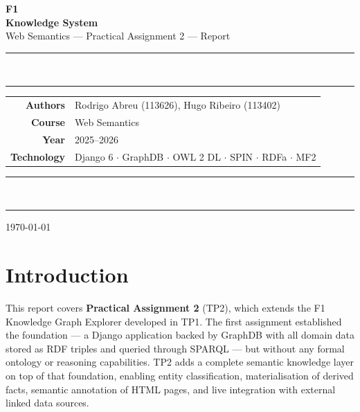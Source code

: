 \documentclass[12pt,a4paper]{article}
\begin{document}
\begin{titlepage}
  \centering
  \vspace*{1.5cm}

  {\fontsize{48}{52}\selectfont\bfseries\color{f1red} F\textcolor{black}{1}}\\[0.4cm]
  {\Large\bfseries Knowledge System}\\[0.3cm]
  {\large\color{darkgray} Web Semantics --- Practical Assignment 2 --- Report}

  \vspace{1.5cm}
  \color{darkgray}\rule{0.4\linewidth}{2pt}\\[0.1cm]
  \color{darkgray}\rule{\linewidth}{0.4pt}
  \vspace{0.5cm}

  \begin{tabular}{rl}
    \textbf{Authors}    & Rodrigo Abreu (113626), Hugo Ribeiro (113402) \\[0.3em]
    \textbf{Course}     & Web Semantics \\[0.3em]
    \textbf{Year}       & 2025--2026 \\[0.3em]
    \textbf{Technology} & Django 6 $\cdot$ GraphDB $\cdot$ OWL 2 DL $\cdot$ SPIN $\cdot$ RDFa $\cdot$ MF2 \\
  \end{tabular}

  \vspace{1.5cm}
  \color{darkgray}\rule{\linewidth}{0.4pt}\\[0.1cm]
  \color{darkgray}\rule{0.4\linewidth}{2pt}

  \vfill
  {\small\color{darkgray}\today}
\end{titlepage}

\tableofcontents
\newpage

\section{Introduction}

This report covers \textbf{Practical Assignment 2} (TP2), which extends the F1 Knowledge Graph Explorer developed in TP1. The first assignment established the foundation --- a Django application backed by GraphDB with all domain data stored as RDF triples and queried through SPARQL --- but without any formal ontology or reasoning capabilities. TP2 adds a complete semantic knowledge layer on top of that foundation, enabling entity classification, materialisation of derived facts, semantic annotation of HTML pages, and live integration with external linked data sources.
\end{document}
